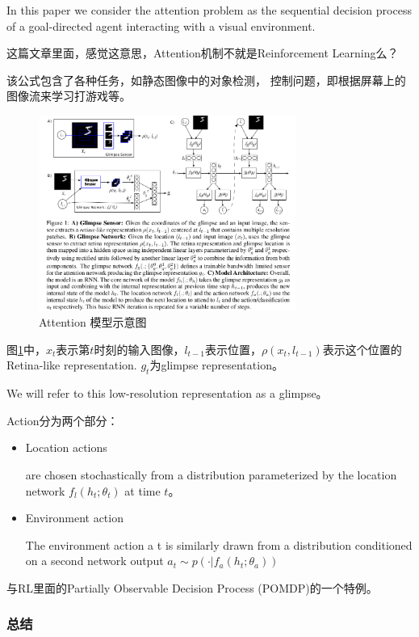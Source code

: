 In this paper we consider the attention problem as the sequential decision process of a goal-directed
agent interacting with a visual environment.

这篇文章里面，感觉这意思，Attention机制不就是Reinforcement Learning么？

该公式包含了各种任务，如静态图像中的对象检测， 控制问题，即根据屏幕上的图像流来学习打游戏等。

\begin{figure}[!htbp]
\centering
\includegraphics[width=0.75\textwidth]{DLTips/Attention0.png}
\caption{Attention 模型示意图}
\label{Attention0}
\end{figure}

图\ref{Attention0}中，$x_t$表示第$t$时刻的输入图像，$l_{t-1}$表示位置，$\rho (x_t, l_{t-1})$表示这个位置的Retina-like representation. $g_t$为glimpse representation。 

We will refer to this low-resolution representation
as a glimpse。

Action分为两个部分：
\begin{itemize}
\item Location actions

are chosen stochastically from a distribution parameterized by the location network $f_l(h_t; \theta_t)$ at time $t$。

\item Environment action

The environment action a t is similarly drawn from a distribution conditioned
on a second network output $a_t \sim p(\cdot | f_a(h_t; \theta_a))$

\end{itemize}

与RL里面的Partially Observable Decision Process (POMDP)的一个特例。

\subsubsection{总结}

